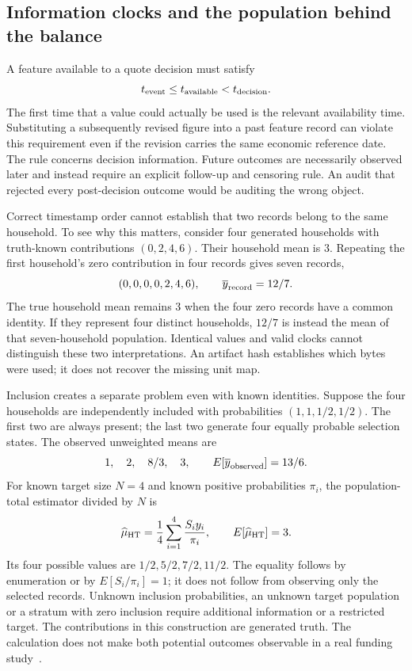 \subsection{Information clocks and the population behind the balance}

A feature available to a quote decision must satisfy
\[
 t_{\rm event}\le t_{\rm available}<t_{\rm decision}.
\]
The first time that a value could actually be used is the relevant
availability time. Substituting a subsequently revised figure into a past
feature record can violate this requirement even if the revision carries
the same economic reference date. The rule concerns decision information.
Future outcomes are necessarily observed later and instead require an
explicit follow-up and censoring rule. An audit that rejected every
post-decision outcome would be auditing the wrong object.

Correct timestamp order cannot establish that two records belong to the same
household. To see why this matters, consider four generated households with
truth-known contributions $(0,2,4,6)$. Their household mean is $3$. Repeating
the first household's zero contribution in four records gives seven records,
\[
 (0,0,0,0,2,4,6),\qquad \overline{y}_{\rm record}=12/7.
\]
The true household mean remains $3$ when the four zero records have a common
identity. If they represent four distinct households, $12/7$ is instead the
mean of that seven-household population. Identical values and valid clocks
cannot distinguish these two interpretations. An artifact hash establishes
which bytes were used; it does not recover the missing unit map.

Inclusion creates a separate problem even with known identities. Suppose the
four households are independently included with probabilities
$(1,1,1/2,1/2)$. The first two are always present; the last two generate four
equally probable selection states. The observed unweighted means are
\[
 1,\quad 2,\quad 8/3,\quad 3,
 \qquad
 E[\overline{y}_{\rm observed}]=13/6.
\]
For known target size $N=4$ and known positive probabilities $\pi_i$, the
population-total estimator divided by $N$ is
\[
 \widehat\mu_{\rm HT}=\frac{1}{4}\sum_{i=1}^{4}
       \frac{S_i y_i}{\pi_i},
 \qquad
 E[\widehat\mu_{\rm HT}]=3.
\]
Its four possible values are $1/2,5/2,7/2,11/2$. The equality follows by
enumeration or by $E[S_i/\pi_i]=1$; it does not follow from observing only
the selected records. Unknown inclusion probabilities, an unknown target
population or a stratum with zero inclusion require additional information
or a restricted target. The contributions in this construction are generated
truth. The calculation does not make both potential outcomes observable in
a real funding study~\citep{exec13_funding_exact}.

